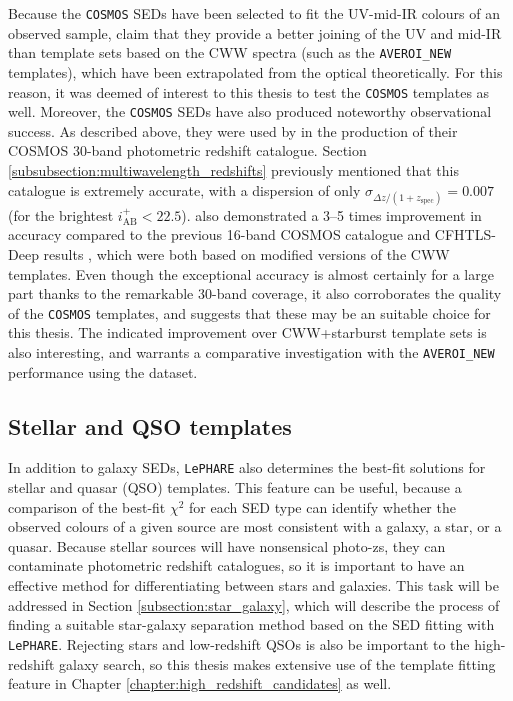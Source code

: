 Because the \texttt{COSMOS} SEDs have been selected to fit the UV-mid-IR colours of an observed sample, \cite{2009ApJ...690.1236I} claim that they provide a better joining of the UV and mid-IR than  template sets based on the CWW spectra (such as the \texttt{AVEROI\_NEW} templates), which have been extrapolated from the optical theoretically. For this reason, it was deemed of interest to this thesis to test the \texttt{COSMOS} templates as well. Moreover, the \texttt{COSMOS} SEDs have also produced noteworthy observational success. As described above, they were used by \cite{2009ApJ...690.1236I} in the production of their COSMOS 30-band photometric redshift catalogue. Section \ref{subsubsection:multiwavelength_redshifts} previously mentioned
that this catalogue is extremely accurate, with a dispersion of only $\sigma_{\Delta z/ (1+z_{\mathrm{spec}})} =0.007$ (for the brightest $i^{+}_{\mathrm{AB}}<22.5$). \cite{2009ApJ...690.1236I} also demonstrated a 3--5 times improvement in accuracy compared to the previous 16-band COSMOS catalogue \citep{2007ApJS..172..117M} and CFHTLS-Deep results \citep{2006A&A...457..841I}, which were both based on modified versions of the CWW templates. Even though the exceptional accuracy is almost certainly for a large part thanks to the remarkable 30-band coverage, it also corroborates the quality of the \texttt{COSMOS} templates, and suggests that these may be an suitable choice for this thesis. The indicated improvement over CWW+starburst template sets is also interesting, and warrants a comparative investigation with the \texttt{AVEROI\_NEW} performance using the \DESVIDEO dataset.  



\subsection{Stellar and QSO templates}\label{subsection:star_qso_templates}
In addition to galaxy SEDs, \texttt{LePHARE} also determines the best-fit solutions for stellar and quasar (QSO) templates. This feature can be useful, because a comparison of the best-fit $\chi^2$ for each SED type can identify whether the observed colours of a given source are most consistent with a galaxy, a star, or a quasar.
Because stellar sources will have nonsensical photo-zs, they can contaminate photometric redshift catalogues, so it is important to have an effective method for differentiating between stars and galaxies. This task will be addressed in Section \ref{subsection:star_galaxy}, which will describe the process of finding a suitable star-galaxy separation method based on the SED fitting with \texttt{LePHARE}. Rejecting stars and low-redshift QSOs is also be important to the high-redshift galaxy search, so this thesis makes extensive use of the template fitting feature in Chapter \ref{chapter:high_redshift_candidates} as well. \par


